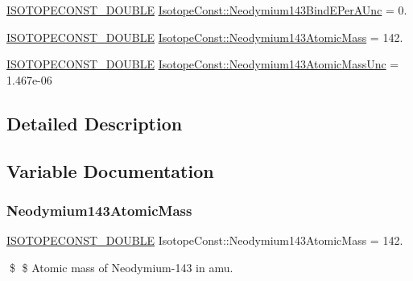 \begin{DoxyCompactItemize}
\mbox{\hyperlink{group___isotope_const-_macros_ga8f45a7272ce02c0b4c65c44636ed719a}{I\+S\+O\+T\+O\+P\+E\+C\+O\+N\+S\+T\+\_\+\+D\+O\+U\+B\+LE}} \mbox{\hyperlink{group___isotope_const-_neodymium-_nd143_ga0d4e12f20ffa1a853bf6dddaa70026a5}{Isotope\+Const\+::\+Neodymium143\+Bind\+E\+Per\+A\+Unc}} = 0.
\item 
\mbox{\hyperlink{group___isotope_const-_macros_ga8f45a7272ce02c0b4c65c44636ed719a}{I\+S\+O\+T\+O\+P\+E\+C\+O\+N\+S\+T\+\_\+\+D\+O\+U\+B\+LE}} \mbox{\hyperlink{group___isotope_const-_neodymium-_nd143_gaf83193aeeebe3443a72593ae5b39c097}{Isotope\+Const\+::\+Neodymium143\+Atomic\+Mass}} = 142.
\item 
\mbox{\hyperlink{group___isotope_const-_macros_ga8f45a7272ce02c0b4c65c44636ed719a}{I\+S\+O\+T\+O\+P\+E\+C\+O\+N\+S\+T\+\_\+\+D\+O\+U\+B\+LE}} \mbox{\hyperlink{group___isotope_const-_neodymium-_nd143_gab04e0c88e75022b5948bdcfe8cea3066}{Isotope\+Const\+::\+Neodymium143\+Atomic\+Mass\+Unc}} = 1.\+467e-\/06
\end{DoxyCompactItemize}


\subsection{Detailed Description}


\subsection{Variable Documentation}
\mbox{\label{group___isotope_const-_neodymium-_nd143_gaf83193aeeebe3443a72593ae5b39c097}} 
\subsubsection{\texorpdfstring{Neodymium143\+Atomic\+Mass}{Neodymium143AtomicMass}}
{\footnotesize\ttfamily \mbox{\hyperlink{group___isotope_const-_macros_ga8f45a7272ce02c0b4c65c44636ed719a}{I\+S\+O\+T\+O\+P\+E\+C\+O\+N\+S\+T\+\_\+\+D\+O\+U\+B\+LE}} Isotope\+Const\+::\+Neodymium143\+Atomic\+Mass = 142.}

\$ \$ Atomic mass of Neodymium-\/143 in amu. \mbox{\label{group___isotope_const-_neodymium-_nd143_gab04e0c88e75022b5948bdcfe8cea3066}} 
